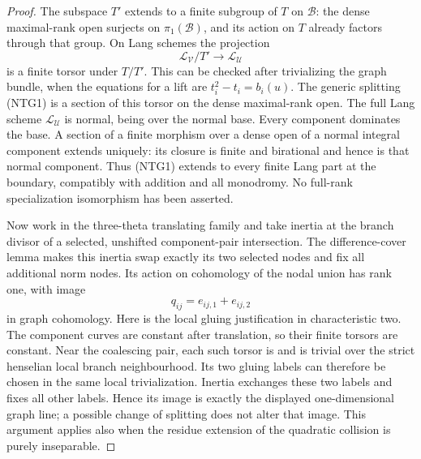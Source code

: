 \begin{proof}
The subspace $T'$ extends to a finite \etale subgroup of $T$
on $\mathcal B$: the dense maximal-rank open surjects on
$\pi_1(\mathcal B)$, and its action on $T$ already factors
through that group. On Lang schemes the projection
\[
              \mathcal L_{\mathcal V}/T'
                         \longrightarrow\mathcal L_{\mathcal U}
\]
is a finite \etale torsor under $T/T'$. This can be checked
after trivializing the graph bundle, when the equations for
a lift are $t_i^2-t_i=b_i(u)$.
The generic splitting (NTG1) is a section of this torsor on
the dense maximal-rank open. The full Lang scheme
$\mathcal L_{\mathcal U}$ is normal, being \etale over
the normal base. Every component dominates the base. A
section of a finite \etale morphism over a dense open of a
normal integral component extends uniquely: its closure is
finite and birational and hence is that normal component.
Thus (NTG1) extends to every finite Lang part at the boundary,
compatibly with addition and all monodromy. No full-rank
specialization isomorphism has been asserted.

Now work in the three-theta translating family and take inertia
at the branch divisor of a selected, unshifted component-pair
intersection. The difference-cover lemma makes this inertia
swap exactly its two selected nodes and fix all additional
norm nodes. Its action on cohomology of the nodal union has
rank one, with image
\[
                     q_{ij}=e_{ij,1}+e_{ij,2}
\]
in graph cohomology. Here is the local gluing justification in
characteristic two. The component curves are constant after
translation, so their finite \etale torsors are constant. Near
the coalescing pair, each such torsor is \etale and is trivial
over the strict henselian local branch neighbourhood. Its two
gluing labels can therefore be chosen in the same local
trivialization. Inertia exchanges these two labels and fixes
all other labels. Hence its image is exactly the displayed
one-dimensional graph line; a possible change of splitting
does not alter that image. This argument applies also when
the residue extension of the quadratic collision is purely
inseparable.


\end{proof}
